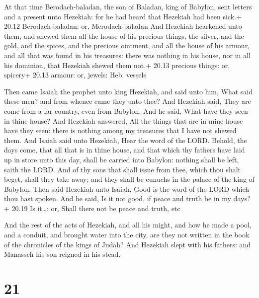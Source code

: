  At that time Berodach-baladan, the son of Baladan, king
of Babylon, sent letters and a present unto Hezekiah: for he had heard
that Hezekiah had been sick.+ 20.12 Berodach-baladan: or,
Merodach-baladan  And Hezekiah hearkened unto them, and
shewed them all the house of his precious things, the silver, and the
gold, and the spices, and the precious ointment, and all the house of
his armour, and all that was found in his treasures: there was nothing
in his house, nor in all his dominion, that Hezekiah shewed them not.+
20.13 precious things: or, spicery+ 20.13 armour: or, jewels: Heb.
vessels

 Then came Isaiah the prophet unto king Hezekiah, and
said unto him, What said these men? and from whence came they unto thee?
And Hezekiah said, They are come from a far country, even from Babylon.
 And he said, What have they seen in thine house? And
Hezekiah answered, All the things that are in mine house have they seen:
there is nothing among my treasures that I have not shewed them.
 And Isaiah said unto Hezekiah, Hear the word of the LORD.
 Behold, the days come, that all that is in thine house,
and that which thy fathers have laid up in store unto this day, shall be
carried into Babylon: nothing shall be left, saith the LORD.
 And of thy sons that shall issue from thee, which thou
shalt beget, shall they take away; and they shall be eunuchs in the
palace of the king of Babylon.  Then said Hezekiah unto
Isaiah, Good is the word of the LORD which thou hast spoken. And he
said, Is it not good, if peace and truth be in my days?+ 20.19 Is
it\ldots: or, Shall there not be peace and truth, etc

 And the rest of the acts of Hezekiah, and all his might,
and how he made a pool, and a conduit, and brought water into the city,
are they not written in the book of the chronicles of the kings of
Judah?  And Hezekiah slept with his fathers: and Manasseh
his son reigned in his stead.

\hypertarget{section-20}{%
\section{21}\label{section-20}}

